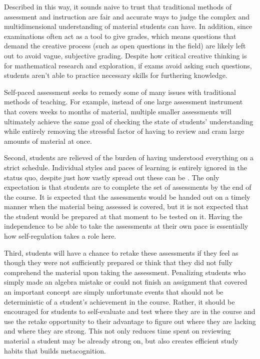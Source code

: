 Described in this way, it sounds naive to trust that traditional methods of assessment and instruction are fair and accurate ways to judge the complex and multidimensional understanding of material students can have. In addition, since examinations often act as a tool to give grades, which means questions that demand the creative process (such as open questions in the field) are likely left out to avoid vague, subjective grading. Despite how critical creative thinking is for mathematical research and exploration, if exams avoid asking such questions, students aren't able to practice necessary skills for furthering knowledge.

Self-paced assessment seeks to remedy some of many issues with traditional methods of teaching. For example, instead of one large assessment instrument that covers weeks to months of material, multiple smaller assessments will ultimately achieve the same goal of checking the state of students' understanding while entirely removing the stressful factor of having to review and cram large amounts of material at once.

Second, students are relieved of the burden of having understood everything on a strict schedule. Individual styles and paces of learning is entirely ignored in the status quo, despite just how vastly spread out these can be \citep{busato_intellectual_2000}. The only expectation is that students are to complete the set of assessments by the end of the course. It is expected that the assessments would be handed out on a timely manner when the material being assessed is covered, but it is not expected that the student would be prepared at that moment to be tested on it. Having the independence to be able to take the assessments at their own pace is essentially how self-regulation takes a role here.

Third, students will have a chance to retake these assessments if they feel as though they were not sufficiently prepared or think that they did not fully comprehend the material upon taking the assessment. Penalizing students who simply made an algebra mistake or could not finish an assignment that covered an important concept are simply unfortunate events that should not be deterministic of a student's achievement in the course. Rather, it should be encouraged for students to self-evaluate and test where they are in the course and use the retake opportunity to their advantage to figure out where they are lacking and where they are strong. This not only reduces time spent on reviewing material a student may be already strong on, but also creates efficient study habits that builds metacognition.

